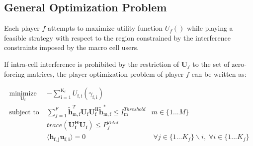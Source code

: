 \documentclass[12pt]{article}
\begin{document}
%
%


\subsection{General Optimization Problem}

Each player $f$ attempts to maximize utility function $U_f()$ while playing a feasible strategy with respect to the region constrained by the interference constraints imposed by the macro cell users.
\par

If intra-cell interference is  prohibited by the restriction of $\mathbf{U}_f$ to the set of zero-forcing matrices, the player optimization problem of player $f$ can be written as:


	\begin{subequations}
	\label{optim}
	\begin{align}
	    \underset{\mathbf{U}_{\mathrm{f}} }{\text{minimize}} \;
	    & - \sum_{\mathrm{i=1}}^{\mathrm{K_f}}
    	U_{\mathrm{f,i}}(\gamma_{\mathrm{f,i}}) \label{player_opt} \\
	    \text{subject to} \; &
	   \sum^F_{f=1} \mathbf{\tilde{h}}_{\mathrm{m,f}}^T  \mathbf{U_{\mathrm{f}}}		
	\mathbf{U_{\mathrm{f}}^{\mathrm{H}}} \mathbf{\tilde{h}_{\mathrm{m,f}}^*} \leq I^{Threshold}		
	_{\mathrm{m}} & m \in \{1 ...M\} 
		\label{interference_const}\\
        & trace(\mathbf{U_f^H}\mathbf{U_f}) \leq P^{Total}_{f} \label{power_const}\\
        & \langle \mathbf{h_{f,j}}\mathbf{u_{f,i}} \rangle =0\ & \; \forall j \in \{1... K_f\}\backslash i ,\; \forall i \in \{1 ... K_f\} \label{zf_const}
	\end{align}
	\end{subequations}
\end{document}
